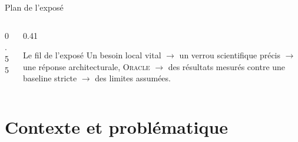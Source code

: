\documentclass[aspectratio=169,10pt]{beamer}
\newcommand{\Oracle}{\textsc{Oracle}}
\begin{document}
\begin{frame}{Plan de l'exposé}
  \vspace{0.2cm}
  \begin{columns}[T]
    \begin{column}{0.55\textwidth}
      \tableofcontents
    \end{column}
    \begin{column}{0.41\textwidth}
      \begin{block}{Le fil de l'exposé}
        \small
        Un besoin local vital $\to$ un verrou scientifique précis $\to$
        une réponse architecturale, \Oracle{} $\to$ des résultats mesurés
        contre une baseline stricte $\to$ des limites assumées.
      \end{block}
    \end{column}
  \end{columns}
\end{frame}

\section{Contexte et problématique}
\end{document}
